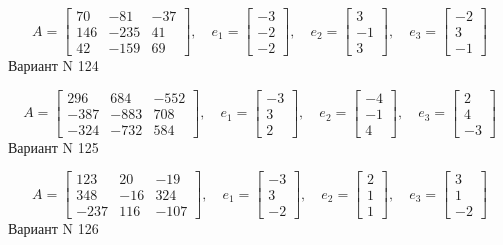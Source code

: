 \documentclass[11pt]{report}
\begin{document}
$$A = \left[\begin{matrix}70 & -81 & -37\\146 & -235 & 41\\42 & -159 & 69\end{matrix}\right],\quad e_1 = \left[\begin{matrix}-3\\-2\\-2\end{matrix}\right],\quad e_2 = \left[\begin{matrix}3\\-1\\3\end{matrix}\right],\quad e_3 = \left[\begin{matrix}-2\\3\\-1\end{matrix}\right]$$Вариант N 124

$$A = \left[\begin{matrix}296 & 684 & -552\\-387 & -883 & 708\\-324 & -732 & 584\end{matrix}\right],\quad e_1 = \left[\begin{matrix}-3\\3\\2\end{matrix}\right],\quad e_2 = \left[\begin{matrix}-4\\-1\\4\end{matrix}\right],\quad e_3 = \left[\begin{matrix}2\\4\\-3\end{matrix}\right]$$Вариант N 125

$$A = \left[\begin{matrix}123 & 20 & -19\\348 & -16 & 324\\-237 & 116 & -107\end{matrix}\right],\quad e_1 = \left[\begin{matrix}-3\\3\\-2\end{matrix}\right],\quad e_2 = \left[\begin{matrix}2\\1\\1\end{matrix}\right],\quad e_3 = \left[\begin{matrix}3\\1\\-2\end{matrix}\right]$$Вариант N 126
\end{document}
